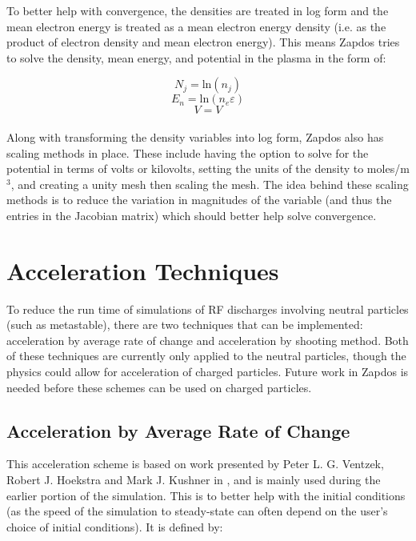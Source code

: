\documentclass[final]{report}
\begin{document}
  To better help with convergence, the densities are treated in log form and the mean electron energy is treated as a mean electron energy density (i.e. as the product of electron density and mean electron energy). This means Zapdos tries to solve the density, mean energy, and potential in the plasma in the form of:

  \begin{equation}
      N_{j} = \text{ln} (n_{j})
  \end{equation}
  \begin{equation}
      E_{n} = \text{ln} (n_{e}\varepsilon)
  \end{equation}
  \begin{equation}
      V = V
  \end{equation}
  \\
  Along with transforming the density variables into log form, Zapdos also has scaling methods in place. These include having the option to solve for the potential in terms of volts or kilovolts, setting the units of the density to moles/m$^3$, and creating a unity mesh then scaling the mesh. The idea behind these scaling methods is to reduce the variation in magnitudes of the variable (and thus the entries in the Jacobian matrix) which should better help solve convergence.

  \section{Acceleration Techniques}

  To reduce the run time of simulations of RF discharges involving neutral particles (such as metastable), there are two techniques that can be implemented: acceleration by average rate of change and acceleration by shooting method. Both of these techniques are currently only applied to the neutral particles, though the physics could allow for acceleration of charged particles. Future work in Zapdos is needed before these schemes can be used on charged particles.

  \subsection{Acceleration by Average Rate of Change}

  This acceleration scheme is based on work presented by Peter L. G. Ventzek, Robert J. Hoekstra and Mark J. Kushner in \cite{AccByAveraging}, and is mainly used during the earlier portion of the simulation. This is to better help with the initial conditions (as the speed of the simulation to steady-state can often depend on the user's choice of initial conditions). It is defined by:
\end{document}
